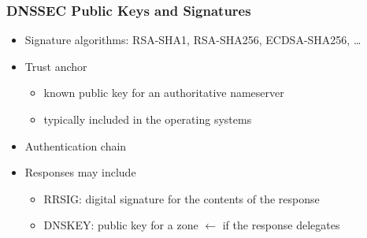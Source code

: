 \documentclass[final]{article}
\begin{document}
\subsubsection*{DNSSEC Public Keys and Signatures}
\begin{itemize}[nosep]
    \item Signature algorithms: RSA-SHA1, RSA-SHA256, ECDSA-SHA256, \dots
    \item Trust anchor
          \begin{itemize}[nosep]
              \item known public key for an authoritative nameserver
              \item typically included in the operating systems
          \end{itemize}
    \item Authentication chain
          \begin{figure}[H]
          \end{figure}
    \item Responses may include
          \begin{itemize}[nosep]
              \item RRSIG: digital signature for the contents of the response
              \item DNSKEY: public key for a zone $\leftarrow$ if the response delegates
          \end{itemize}
\end{itemize}
\end{document}
